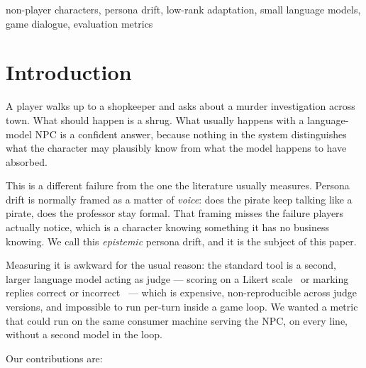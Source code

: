 \documentclass[conference]{IEEEtran}
\begin{document}
\begin{IEEEkeywords}
non-player characters, persona drift, low-rank adaptation, small language
models, game dialogue, evaluation metrics
\end{IEEEkeywords}

\section{Introduction}

A player walks up to a shopkeeper and asks about a murder investigation across
town. What should happen is a shrug. What usually happens with a language-model
NPC is a confident answer, because nothing in the system distinguishes what the
character may plausibly know from what the model happens to have absorbed.

This is a different failure from the one the literature usually measures.
Persona drift is normally framed as a matter of \emph{voice}: does the pirate
keep talking like a pirate, does the professor stay formal. That framing misses
the failure players actually notice, which is a character knowing something it
has no business knowing. We call this \emph{epistemic} persona drift, and it is
the subject of this paper.

Measuring it is awkward for the usual reason: the standard tool is a second,
larger language model acting as judge --- scoring on a Likert
scale~\cite{liu2025personalized} or marking replies correct or
incorrect~\cite{braas2025fixed} --- which is expensive, non-reproducible across
judge versions, and impossible to run per-turn inside a game loop. We wanted a metric that could
run on the same consumer machine serving the NPC, on every line, without a
second model in the loop.

Our contributions are:
\end{document}

